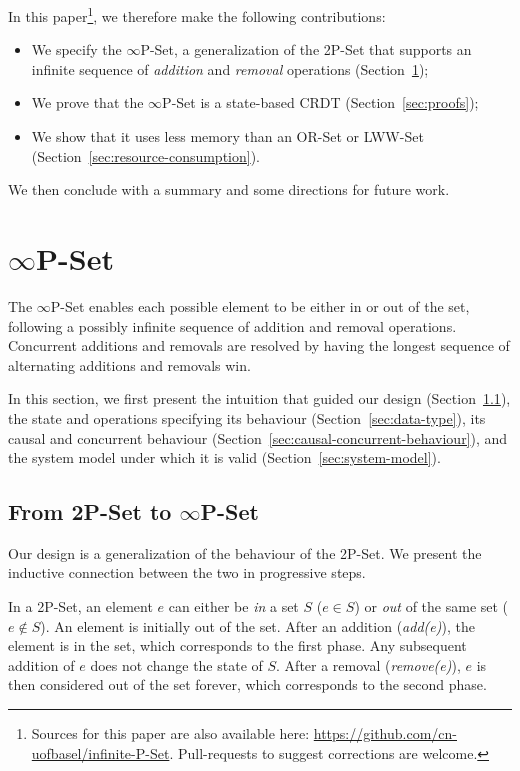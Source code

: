 \documentclass[11pt, oneside]{article}   	%
\begin{document}
In this paper\footnote{Sources for this paper are also available here: \url{https://github.com/cn-uofbasel/infinite-P-Set}. Pull-requests to suggest corrections are welcome.}, we therefore make the following contributions:
\begin{itemize}
	\item We specify the $\infty$P-Set, a generalization of the 2P-Set that supports an infinite sequence of \textit{addition} and \textit{removal} operations (Section~\ref{sec:specification});
	\item We prove that the $\infty$P-Set is a state-based CRDT (Section~\ref{sec:proofs});
	\item We show that it uses less memory than an OR-Set or LWW-Set (Section~\ref{sec:resource-consumption}).
\end{itemize}

We then conclude with a summary and some directions for future work.

\section{$\infty$P-Set}
\label{sec:specification}

The $\infty$P-Set enables each possible element to be either in or out of the set, following a possibly infinite sequence of addition and removal operations. Concurrent additions and removals are resolved by having the longest sequence of alternating additions and removals win. 

In this section, we first present the intuition that guided our design (Section~\ref{sec:intuition}), the state and operations specifying its behaviour (Section~\ref{sec:data-type}), its causal and concurrent behaviour (Section~\ref{sec:causal-concurrent-behaviour}), and the system model under which it is valid (Section~\ref{sec:system-model}).

\subsection{From 2P-Set to $\infty$P-Set}
\label{sec:intuition}

Our design is a generalization of the behaviour of the 2P-Set. We present the inductive connection between the two in progressive steps. 

In a 2P-Set, an element $e$ can either be \textit{in} a set $S$ ($e \in S$) or \textit{out} of the same set ($e \notin S$). An element is initially out of the set. After an addition (\textit{add(e)}), the element is in the set, which corresponds to the first phase. Any subsequent addition of $e$ does not change the state of $S$. After a removal (\textit{remove(e)}), $e$ is then considered out of the set forever, which corresponds to the second phase.
\end{document}
